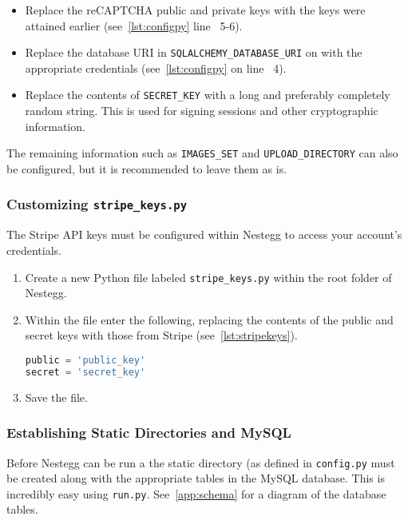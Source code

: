 \documentclass[11pt]{article}
\newcommand{\cmd}[1]{\textcolor{code}{\texttt{#1}}}
\begin{document}
				
				
				\begin{itemize}
					\item Replace the reCAPTCHA public and private keys with the keys were attained earlier (see~\cref{lst:configpy} line \textnumero\ 5-6).
					\item Replace the database URI in \cmd{SQLALCHEMY\_DATABASE\_URI} on with the appropriate  credentials (see~\cref{lst:configpy} on line \textnumero\ 4).
					\item Replace the contents of \cmd{SECRET\_KEY} with a long and preferably completely random string. This is used for signing sessions and other cryptographic information.
				\end{itemize}
				
				The remaining information such as \cmd{IMAGES\_SET} and \cmd{UPLOAD\_DIRECTORY} can also be configured, but it is recommended to leave them as is.
				
			\subsubsection{Customizing \cmd{stripe\_keys.py}}
				The Stripe API keys must be configured within Nestegg to access your account's credentials.
				
				\begin{enumerate}
					\item Create a new Python file labeled \cmd{stripe\_keys.py} within the root folder of Nestegg.
					\item Within the file enter the following, replacing the contents of the public and secret keys with those from Stripe (see~\cref{lst:stripekeys}).
					\begin{lstlisting}[language=python,numbers=none,label={lst:stripekeys},caption=stripe\_keys.py]
public = 'public_key'
secret = 'secret_key'
					\end{lstlisting}
					\item Save the file.
				\end{enumerate}
			\subsubsection{Establishing Static Directories and MySQL}
				Before Nestegg can be run a the static directory (as defined in \cmd{config.py} must be created along with the appropriate tables in the MySQL database. This is incredibly easy using \cmd{run.py}. See~\cref{app:schema} for a diagram of the database tables.
				
\end{document}
